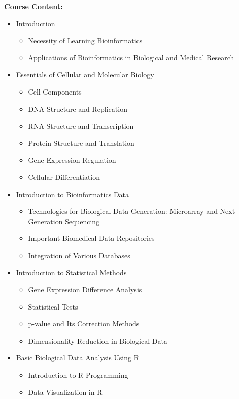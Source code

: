 \documentclass[12pt]{article}
\begin{document}
\textbf{Course Content:}

\begin{itemize}
    \item Introduction
    \begin{itemize}
        \item Necessity of Learning Bioinformatics
        \item Applications of Bioinformatics in Biological and Medical Research
    \end{itemize}
    \item Essentials of Cellular and Molecular Biology
    \begin{itemize}
        \item Cell Components
        \item DNA Structure and Replication
        \item RNA Structure and Transcription
        \item Protein Structure and Translation
        \item Gene Expression Regulation
        \item Cellular Differentiation
    \end{itemize}
    \item Introduction to Bioinformatics Data
    \begin{itemize}
        \item Technologies for Biological Data Generation: Microarray and Next Generation Sequencing
        \item Important Biomedical Data Repositories
        \item Integration of Various Databases
    \end{itemize}
    \item Introduction to Statistical Methods
    \begin{itemize}
        \item Gene Expression Difference Analysis
        \item Statistical Tests
        \item p-value and Its Correction Methods
        \item Dimensionality Reduction in Biological Data
    \end{itemize}
    \item Basic Biological Data Analysis Using R
    \begin{itemize}
        \item Introduction to R Programming
        \item Data Visualization in R

\end{itemize}
\end{itemize}
\end{document}
